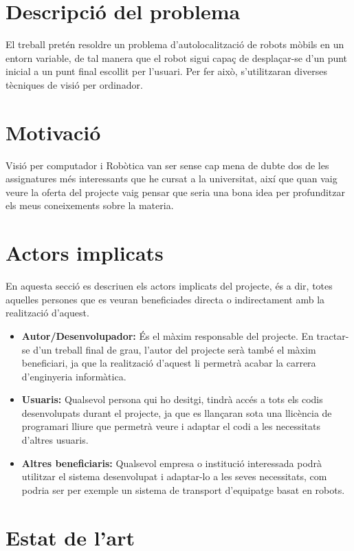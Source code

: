 \section{Descripció del problema}
	El treball pretén resoldre un problema d'autolocalització de robots mòbils en un entorn variable, de tal manera que el robot sigui capaç de desplaçar-se d'un punt inicial a un punt final escollit per
	l'usuari. Per fer això, s'utilitzaran diverses tècniques de visió per ordinador.
\section{Motivació}
	Visió per computador i Robòtica van ser sense cap mena de dubte dos de les assignatures més interessants que he cursat a la universitat, així que quan vaig veure la oferta del projecte vaig pensar que
	seria una bona idea per profunditzar els meus coneixements sobre la materia.
\section{Actors implicats}
	En aquesta secció es descriuen els actors implicats del projecte, és a dir, totes aquelles persones que es veuran beneficiades directa o indirectament amb la realització d'aquest.\\
	\begin{itemize}
		\item \textbf{Autor/Desenvolupador:} És el màxim responsable del projecte. En tractar-se d'un treball final de grau, l'autor del projecte serà també el màxim beneficiari, ja que la realització d'aquest li permetrà acabar la carrera d'enginyeria informàtica.
		\item \textbf{Usuaris:} Qualsevol persona qui ho desitgi, tindrà accés a tots els codis desenvolupats durant el projecte, ja que es llançaran sota una llicència de programari lliure que permetrà veure i adaptar el codi a les necessitats d'altres usuaris.
		\item \textbf{Altres beneficiaris:} Qualsevol empresa o institució interessada podrà utilitzar el sistema desenvolupat i adaptar-lo a les seves necessitats, com podria ser per exemple un sistema de transport d'equipatge basat en robots.
	\end{itemize}
\newpage
\section{Estat de l'art}
